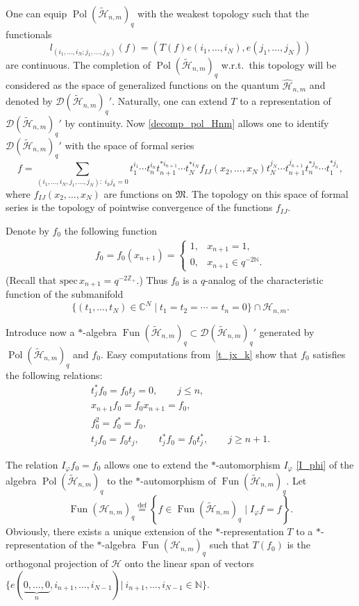 \documentclass[pdftex]{sigma}
\begin{document}
One can equip $\operatorname{Pol}(\widetilde{\mathscr{H}}_{n,m})_q$ with the weakest topology such that the
functionals
\[
l_{(i_1,\ldots,i_N;j_1,\ldots,j_N)}(f)=(T(f)e(i_1,\ldots,i_N),e(j_1,\ldots,j_N))
\]
are continuous. The completion of $\operatorname{Pol}(\widetilde{\mathscr{H}}_{n,m})_q$ w.r.t.\ this topology
will be considered as the space of generalized functions on the quantum $\widehat{\mathscr{H}}_{n,m}$ and
denoted by $\mathscr{D}(\widetilde{\mathscr{H}}_{n,m})_q'$. Naturally, one can extend $T$ to a representation
of $\mathscr{D}(\widetilde{\mathscr{H}}_{n,m})_q'$ by continuity. Now \eqref{decomp_pol_Hnm} allows one to
identify $\mathscr{D}(\widetilde{\mathscr{H}}_{n,m})_q'$ with the space of formal series
\[
f=\sum_{(i_1,\ldots,i_N,j_1,\ldots,j_N):\;i_kj_k=0} t_1^{i_1}\cdots
t_n^{i_n}t_{n+1}^{*i_{n+1}}\cdots t_N^{*i_N}f_{IJ}(x_2,\ldots,x_N)t_N^{j_N}\cdots
t_{n+1}^{j_{n+1}}t_n^{*j_n}\cdots t_1^{*j_1},
\]
where $f_{IJ}(x_2,\ldots,x_N)$ are functions on $\mathfrak{M}$. The topology on this space of formal series
is the topology of pointwise convergence of the functions $f_{IJ}$.


Denote by $f_0$ the following function
\begin{gather}\label{f_0(x_n+1)}
f_0=f_0(x_{n+1})=
\begin{cases}
1, & x_{n+1}=1,
\\ 0, & x_{n+1}\in q^{-2\mathbb{N}}.
\end{cases}
\end{gather}
(Recall that $\mathrm{spec}\,x_{n+1}=q^{-2\mathbb{Z}_+}$.) Thus $f_0$ is a $q$-analog of the characteristic
function of the submanifold
\[
\big\{ (t_1,\ldots,t_N)\in\mathbb{C}^N\; \big|\;t_1=t_2=\cdots=t_n=0 \big\}\cap\mathscr{H}_{n,m}.
\]

Introduce now a $*$-algebra $\operatorname{Fun}(\widetilde{\mathscr{H}}_{n,m})_q \subset
\mathscr{D}(\widetilde{\mathscr{H}}_{n,m})_q'$ generated by
$\operatorname{Pol}(\widetilde{\mathscr{H}}_{n,m})_q$ and $f_0$. Easy computations from~\eqref{t_jx_k} show
that $f_0$ satisf\/ies the following relations:
\begin{gather*}
 t_j^*f_0=f_0t_j=0,\qquad j\le n,
\\  x_{n+1}f_0=f_0x_{n+1}=f_0,
\\  f_0^2=f_0^*=f_0,
\\  t_jf_0=f_0t_j,\qquad t_j^*f_0=f_0t_j^*,\qquad j\ge n+1.
\end{gather*}

The relation $I_\varphi f_0=f_0$ allows one to extend the $*$-automorphism $I_\varphi$ \eqref{I_phi} of the
algebra $\operatorname{Pol}(\widetilde{\mathscr{H}}_{n,m})_q$ to the $*$-automorphism of
$\operatorname{Fun}(\widetilde{\mathscr{H}}_{n,m})_q$. Let
\[
\operatorname{Fun}(\mathscr{H}_{n,m})_q\overset{\mathrm{def}}{=} \left\{ f\in
\operatorname{Fun}(\widetilde{\mathscr{H}}_{n,m})_q\;\big|\; I_\varphi f=f\right\}.
\]
Obviously, there exists a unique extension of the $*$-representation $T$ to a $*$-representation of the
$*$-algebra $\operatorname{Fun}(\mathscr{H}_{n,m})_q$ such that $T(f_0)$ is the orthogonal projection of
$\mathscr{H}$ onto the linear span of vectors $\{e(\underbrace{0,\ldots,0}_n,i_{n+1},\ldots,i_{N-1})|\:
i_{n+1},\ldots,i_{N-1}\in\mathbb{N}\}$.
\end{document}
